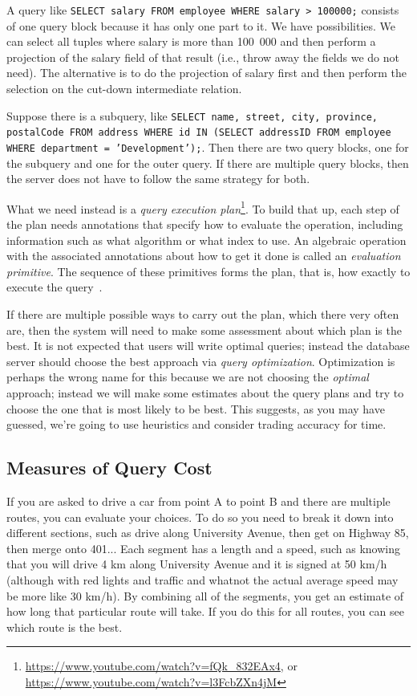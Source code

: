 A query like \texttt{SELECT salary FROM employee WHERE salary > 100000;} consists of one query block because it has only one part to it. We have possibilities. We can select all tuples where salary is more than 100~000 and then perform a projection of the salary field of that result (i.e., throw away the fields we do not need). The alternative is to do the projection of salary first and then perform the selection on the cut-down intermediate relation.

Suppose there is a subquery, like \texttt{SELECT name, street, city, province, postalCode FROM address WHERE id IN (SELECT addressID FROM employee WHERE department = 'Development');}. Then there are two query blocks, one for the subquery and one for the outer query. If there are multiple query blocks, then the server does not have to follow the same strategy for both.

What we need instead is a \textit{query execution plan}\footnote{\url{https://www.youtube.com/watch?v=fQk_832EAx4}, or \url{https://www.youtube.com/watch?v=l3FcbZXn4jM}}. To build that up, each step of the plan needs annotations that specify how to evaluate the operation, including information such as what algorithm or what index to use. An algebraic operation with the associated annotations about how to get it done is called an \textit{evaluation primitive}. The sequence of these primitives forms the plan, that is, how exactly to execute the query~\cite{dsc}. 

If there are multiple possible ways to carry out the plan, which there very often are, then the system will need to make some assessment about which plan is the best. It is not expected that users will write optimal queries; instead the database server should choose the best approach via \textit{query optimization}. Optimization is perhaps the wrong name for this because we are not choosing the \textit{optimal} approach; instead we will make some estimates about the query plans and try to choose the one that is most likely to be best. This suggests, as you may have guessed, we're going to use heuristics and consider trading accuracy for time.

\subsection*{Measures of Query Cost}

If you are asked to drive a car from point A to point B and there are multiple routes, you can evaluate your choices. To do so you need to break it down into different sections, such as drive along University Avenue, then get on Highway 85, then merge onto 401... Each segment has a length and a speed, such as knowing that you will drive 4 km along University Avenue and it is signed at 50 km/h (although with red lights and traffic and whatnot the actual average speed may be more like 30 km/h). By combining all of the segments, you get an estimate of how long that particular route will take. If you do this for all routes, you can see which route is the best. 

